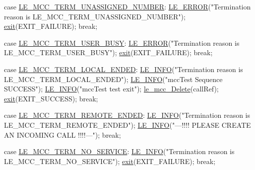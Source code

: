 \begin{DoxyCodeInclude}
{{            \textcolor{keywordflow}{case} \hyperlink{le__mcc__interface_8h_abda706f723ba619f9bc460bcc9a4960da2efa341f50cb8abef243d8ea2b9fac7d}{LE\_MCC\_TERM\_UNASSIGNED\_NUMBER}:
                \hyperlink{le__log_8h_a353590f91b3143a7ba3a416ae5a50c3d}{LE\_ERROR}(\textcolor{stringliteral}{"Termination reason is LE\_MCC\_TERM\_UNASSIGNED\_NUMBER"});
                \hyperlink{app_stop_client_8c_a310220604a584e112ba8f7aa3dfe23f1}{exit}(EXIT\_FAILURE);
                \textcolor{keywordflow}{break};

            \textcolor{keywordflow}{case} \hyperlink{le__mcc__interface_8h_abda706f723ba619f9bc460bcc9a4960dad7664d1f5a0c6517861637d0a083020c}{LE\_MCC\_TERM\_USER\_BUSY}:
                \hyperlink{le__log_8h_a353590f91b3143a7ba3a416ae5a50c3d}{LE\_ERROR}(\textcolor{stringliteral}{"Termination reason is LE\_MCC\_TERM\_USER\_BUSY"});
                \hyperlink{app_stop_client_8c_a310220604a584e112ba8f7aa3dfe23f1}{exit}(EXIT\_FAILURE);
                \textcolor{keywordflow}{break};

            \textcolor{keywordflow}{case} \hyperlink{le__mcc__interface_8h_abda706f723ba619f9bc460bcc9a4960daf4262288191582892e6f84e51e3082c1}{LE\_MCC\_TERM\_LOCAL\_ENDED}:
                \hyperlink{le__log_8h_a23e6d206faa64f612045d688cdde5808}{LE\_INFO}(\textcolor{stringliteral}{"Termination reason is LE\_MCC\_TERM\_LOCAL\_ENDED"});
                \hyperlink{le__log_8h_a23e6d206faa64f612045d688cdde5808}{LE\_INFO}(\textcolor{stringliteral}{"mccTest Sequence SUCCESS"});
                \hyperlink{le__log_8h_a23e6d206faa64f612045d688cdde5808}{LE\_INFO}(\textcolor{stringliteral}{"mccTest test exit"});
                \hyperlink{le__mcc__interface_8h_a1a016e6443df2d3ee99113649f4f34ae}{le\_mcc\_Delete}(callRef);
                \hyperlink{app_stop_client_8c_a310220604a584e112ba8f7aa3dfe23f1}{exit}(EXIT\_SUCCESS);
                \textcolor{keywordflow}{break};

            \textcolor{keywordflow}{case} \hyperlink{le__mcc__interface_8h_abda706f723ba619f9bc460bcc9a4960dad33c3e71bdfd7513392f28bf2a7e9c9b}{LE\_MCC\_TERM\_REMOTE\_ENDED}:
                \hyperlink{le__log_8h_a23e6d206faa64f612045d688cdde5808}{LE\_INFO}(\textcolor{stringliteral}{"Termination reason is LE\_MCC\_TERM\_REMOTE\_ENDED"});
                \hyperlink{le__log_8h_a23e6d206faa64f612045d688cdde5808}{LE\_INFO}(\textcolor{stringliteral}{"---!!!! PLEASE CREATE AN INCOMING CALL !!!!---"});
                \textcolor{keywordflow}{break};

            \textcolor{keywordflow}{case} \hyperlink{le__mcc__interface_8h_abda706f723ba619f9bc460bcc9a4960da4e0eb63003598ed7103a45ea5521598d}{LE\_MCC\_TERM\_NO\_SERVICE}:
                \hyperlink{le__log_8h_a23e6d206faa64f612045d688cdde5808}{LE\_INFO}(\textcolor{stringliteral}{"Termination reason is LE\_MCC\_TERM\_NO\_SERVICE"});
                \hyperlink{app_stop_client_8c_a310220604a584e112ba8f7aa3dfe23f1}{exit}(EXIT\_FAILURE);
                \textcolor{keywordflow}{break};

}}
\end{DoxyCodeInclude}
